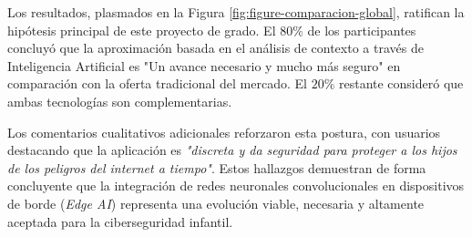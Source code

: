 Los resultados, plasmados en la Figura \ref{fig:figure-comparacion-global}, ratifican la hipótesis principal de este proyecto de grado. El $80\%$ de los participantes concluyó que la aproximación basada en el análisis de contexto a través de Inteligencia Artificial es "Un avance necesario y mucho más seguro" en comparación con la oferta tradicional del mercado. El $20\%$ restante consideró que ambas tecnologías son complementarias. 

Los comentarios cualitativos adicionales reforzaron esta postura, con usuarios destacando que la aplicación es \textit{"discreta y da seguridad para proteger a los hijos de los peligros del internet a tiempo"}. Estos hallazgos demuestran de forma concluyente que la integración de redes neuronales convolucionales en dispositivos de borde (\textit{Edge AI}) representa una evolución viable, necesaria y altamente aceptada para la ciberseguridad infantil.